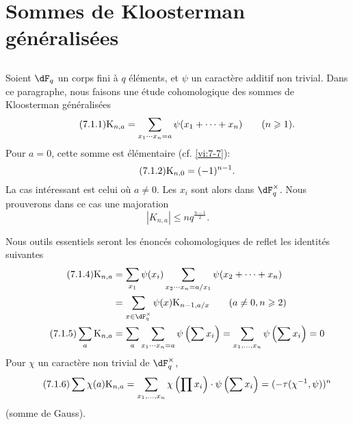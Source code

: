 \section{Sommes de Kloosterman g\'en\'eralis\'ees}\label{VI:7}





\subsection{}\label{VI:7-1}

Soient $\dF_q$ un corps fini \`a $q$ \'el\'ements, et $\psi$ un caract\`ere 
additif non trivial. Dans ce paragraphe, nous faisons une \'etude cohomologique 
des sommes de Kloosterman g\'en\'eralis\'ees 
\begin{equation*}\tag{7.1.1}\label{VI;eq:7-1-1}
  \textnormal{K}_{n,a} = \sum_{x_1\dotsm x_n = a} \psi(x_1+\cdots + x_n) \qquad (n\geqslant 1) \text{.} 
\end{equation*}
Pour $a=0$, cette somme est \'el\'ementaire (cf. \ref{vi:7-7}): 
\begin{equation*}\tag{7.1.2}\label{VI:eq:7-1-2}
  \textnormal{K}_{n,0} = (-1)^{n-1} \text{.} 
\end{equation*}
La cas int\'eressant est celui o\`u $a\ne 0$. Les $x_i$ sont alors dans 
$\dF_q^\times$. Nous prouverons dans ce cas une majoration 
\begin{equation*}\tag{7.1.3}\label{VI:eq:7-1-3}
  \left|K_{n,a}\right| \leqslant n q^{\frac{n-1}{2}} \text{.} 
\end{equation*}

Nous outils essentiels seront les \'enonc\'es cohomologiques de reflet les 
identit\'es suivantes 
\begin{align*}\tag{7.1.4}\label{VI:eq:7-1-4}
  \kloos_{n,a} &= \sum_{x_1} \psi(x_i) \sum_{x_2\dotsm x_n = a/x_1} \psi(x_2+\cdots + x_n) \\ \notag
    &= \sum_{x\in \dF_q^\times} \psi(x) \kloos_{n-1,a/x} \qquad (a\ne 0,n\geqslant 2) \\ \tag{7.1.5}\label{VI:eq:7-1-5}
  \sum_a \kloos_{n,a} &= \sum_a \sum_{x_1 \dotsm x_n = a} \psi\left(\sum x_i\right) = \sum_{x_1,\dots,x_n} \psi\left(\sum x_i\right) = 0 
\end{align*}
Pour $\chi$ un caract\`ere non trivial de $\dF_q^\times$, 
\begin{equation*}\tag{7.1.6}\label{VI:eq:7-1-6}
  \sum \chi(a) \textnormal{K}_{n,a} = \sum_{x_1,\dots,x_n} \chi\left(\prod x_i\right) \cdot \psi\left(\sum x_i\right) = (-\tau(\chi^{-1},\psi))^n 
\end{equation*}
(somme de Gauss). 





